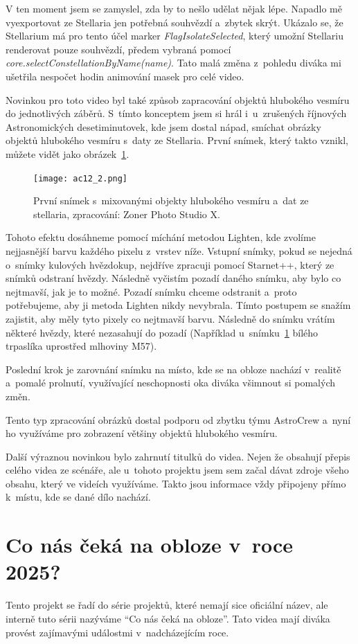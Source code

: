 \documentclass[12pt,a4paper,titlepage]{article}
\begin{document}
V ten moment jsem se zamyslel, zda by to nešlo udělat nějak lépe. Napadlo mě vyexportovat ze Stellaria jen potřebná souhvězdí a~zbytek skrýt. Ukázalo se, že Stellarium má pro tento účel marker \textit{FlagIsolateSelected}, který umožní Stellariu renderovat pouze souhvězdí, předem vybraná pomocí \textit{core.\-select\-Constellation\-By\-Name(name)}. Tato malá změna z~pohledu diváka mi ušetřila nespočet hodin animování masek pro celé video. %

Novinkou pro toto video byl také způsob zapracování objektů hlubokého vesmíru do jednotlivých záběrů. S~tímto konceptem jsem si hrál i~u~zrušených říjnových Astronomických desetiminutovek, kde jsem dostal nápad, smíchat obrázky objektů hlubokého vesmíru s~daty ze Stellaria. První snímek, který takto vznikl, můžete vidět jako obrázek~\ref{prac:ac12_2}. 

\begin{figure}[H]
	\centering
	\texttt{[image: ac12\_2.png]}
	\caption{První snímek s~mixovanými objekty hlubokého vesmíru a~dat ze stellaria, zpracování: Zoner Photo Studio X.}\label{prac:ac12_2}
\end{figure}

Tohoto efektu dosáhneme pomocí míchání metodou Lighten, kde zvolíme nejjasnější barvu každého pixelu z~vrstev níže. Vstupní snímky, pokud se nejedná o~snímky kulových hvězdokup, nejdříve zpracuji pomocí Starnet++, který ze snímků odstraní hvězdy. Následně vyčistím pozadí daného snímku, aby bylo co nejtmavší, jak je to možné. Pozadí snímku chceme odstranit a~proto potřebujeme, aby ji metoda Lighten nikdy nevybrala. Tímto postupem se snažím zajistit, aby měly tyto pixely co nejtmavší barvu. Následně do snímku vrátím některé hvězdy, které nezasahují do pozadí (Například u~snímku~\ref{prac:ac12_2} bílého trpaslíka uprostřed mlhoviny M57).

Poslední krok je zarovnání snímku na místo, kde se na obloze nachází v~realitě a~pomalé prolnutí, využívající neschopnosti oka diváka všimnout si pomalých změn.

Tento typ zpracování obrázků dostal podporu od zbytku týmu AstroCrew a~nyní ho využíváme pro zobrazení většiny objektů hlubokého vesmíru.

Další výraznou novinkou bylo zahrnutí titulků do videa. Nejen že obsahují přepis celého videa ze scénáře, ale u~tohoto projektu jsem sem začal dávat zdroje všeho obsahu, který ve videích využíváme. Takto jsou informace vždy připojeny přímo k~místu, kde se dané dílo nachází.
\section{Co nás čeká na obloze v~roce 2025?}
Tento projekt se řadí do série projektů, které nemají sice oficiální název, ale interně tuto sérii nazýváme \enquote{Co nás čeká na obloze}. Tato videa mají diváka provést zajímavými událostmi v~nadcházejícím roce.
\end{document}

